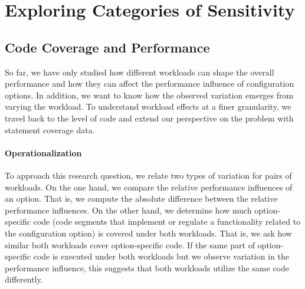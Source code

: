 {

\section{Exploring Categories of Sensitivity}\label{sec:categories}
\subsection{Code Coverage and Performance}\label{sec:rq3}
So far, we have only studied how different workloads can shape the overall performance and how they can affect the performance influence of configuration options. In addition, we want to know how the observed variation emerges from  varying the workload. To understand workload effects at a finer granularity, we travel back to the level of code and extend our perspective on the problem with statement coverage data. 

\paragraph*{Operationalization}
To approach this research question, we relate two types of variation for pairs of workloads. On the one hand, we compare the relative performance influences of an option. That is, we compute the absolute difference between the relative performance influences. On the other hand, we determine how much option-specific code (code segments that implement or regulate a functionality related to the configuration option) is covered under both workloads. That is, we ask how similar both workloads cover option-specific code. If the same part of option-specific code is executed under both workloads but we observe variation in the performance influence, this suggests that both workloads utilize the same code differently.



}
